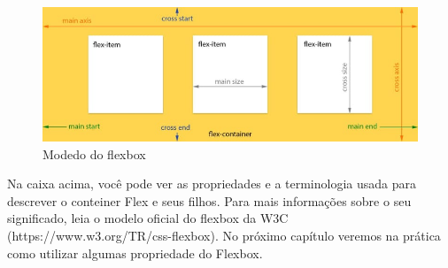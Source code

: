 \begin{figure}[H]
  \centering
  \includegraphics[scale=0.6]{imagens/CSS3-Flexbox-Model.jpg}
  \caption{Modedo do flexbox}
  \label{fig:model-flexbox}
\end{figure}

Na caixa acima, você pode ver as propriedades e a terminologia usada para descrever o conteiner Flex e seus filhos. Para mais informações sobre o seu significado, leia o modelo oficial do flexbox da W3C (https://www.w3.org/TR/css-flexbox). No próximo capítulo veremos na prática como utilizar algumas propriedade do Flexbox. 



